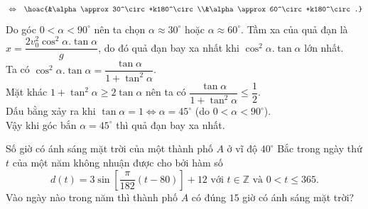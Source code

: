 \begin{ex}
{\begin{itemchoice}
\begin{eqnarray*}
				&\Leftrightarrow &\hoac{&\alpha\approx 30^\circ +k180^\circ \\&\alpha\approx 60^\circ +k180^\circ.}
			\end{eqnarray*} Do góc $0<\alpha<90^\circ$ nên ta chọn $\alpha\approx 30^\circ$ hoặc $\alpha\approx 60^\circ$.
			\itemch Tầm  xa của quả đạn  là $x=\dfrac{2 v_0^2 \cos ^2 \alpha.\tan \alpha}{g}$, do đó quả đạn bay xa nhất khi $ \cos ^2 \alpha.\tan \alpha$ lớn nhất.\\
			Ta có $\cos ^2 \alpha.\tan \alpha =\dfrac{\tan \alpha}{1+\tan^2\alpha}$.\\ Mặt khác $1+\tan^2\alpha \ge 2\tan\alpha$  nên ta có $\dfrac{\tan \alpha}{1+\tan^2\alpha} \le \dfrac{1}{2}$.\\  Dấu bằng xảy ra khi $\tan\alpha =1 \Leftrightarrow \alpha=45^\circ $ (do $0<\alpha<90^\circ$). \\
			Vậy khi góc bắn $\alpha=45^\circ$ thì quả đạn bay xa nhất.
		\end{itemchoice}
	}
\end{ex}

\begin{bt}%
	Số giờ có ánh sáng mặt trời của một thành phố $A$ ở vĩ độ $40^\circ$ Bắc trong ngày thứ $t$ của một năm không nhuận được cho bởi hàm số
	\[
	d(t)=3\sin \left[\dfrac{\pi}{182}(t-80)\right] +12 \text{ với } t\in \mathbb{Z} \text{ và } 0<t\leq 365.
	\]
	Vào ngày nào trong năm thì thành phố $A$ có đúng $15$ giờ có ánh sáng mặt trời?
\end{bt}

